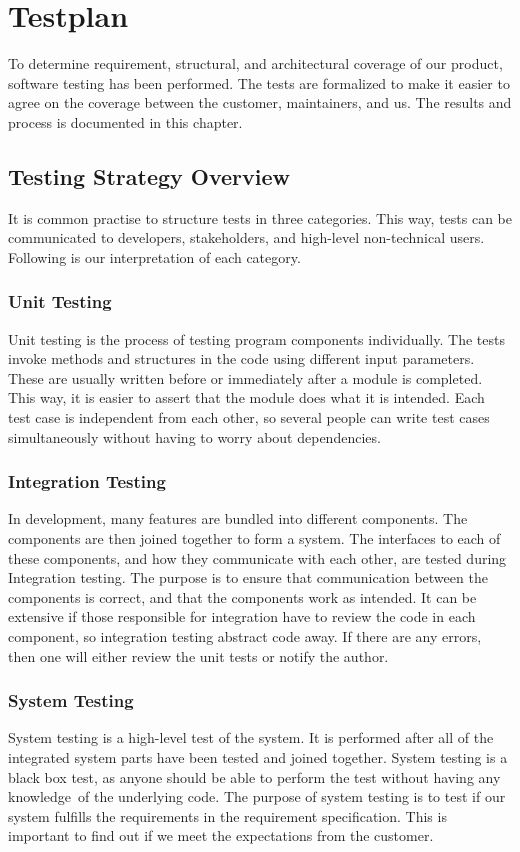 \chapter{Testplan}
To determine requirement, structural, and architectural coverage of our
product, software testing has been performed. The tests are formalized
to make it easier to agree on the coverage between the customer,
maintainers, and us. The results and process is documented in this
chapter.

\section{Testing Strategy Overview}
It is common practise to structure tests in three categories. This way,
tests can be communicated to developers, stakeholders, and high-level
non-technical users. 
Following is our interpretation of each category.
\subsection{Unit Testing}
Unit testing is the process of testing program components individually.
The tests invoke methods and structures in the code using different
input parameters. These are usually written before or
immediately after a module is completed. This way, it is easier to
assert that the module does what it is intended. Each test case is
independent from each other, so several people can write test cases
simultaneously without having to worry about dependencies.

\subsection{Integration Testing}
In development, many features are bundled into different components. The
components are then joined together to form a system. The interfaces to 
each of these components, and how they communicate with each other, are tested during Integration
testing. The purpose is to ensure that
communication between the components is correct, and that the
components work as intended. It can be extensive if those responsible
for integration have to review the code in each component, so
integration testing abstract code away. If there are any errors, then
one will either review the unit tests or notify the author.

\subsection{System Testing}
System testing is a high-level test of the system. It is performed after
all of the integrated system parts have been tested and joined
together. System testing is a black box test, as anyone should be able
to perform the test without having any knowledge\ of the underlying
code. The purpose of system testing is to test if our system fulfills
the requirements in the requirement specification. This is important to
find out if we meet the expectations from the customer. 


